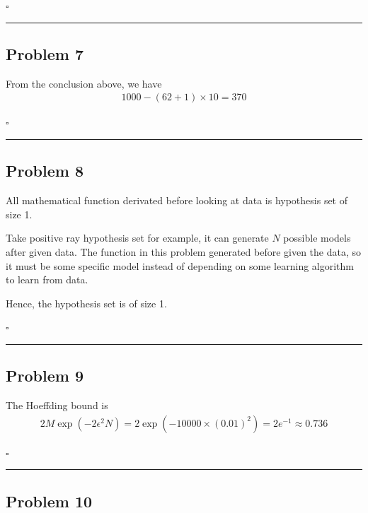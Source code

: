 \documentclass[12pt]{article}
\newcommand*{\QEDB}{\hfill\ensuremath{\square}}
\newcommand{\ParTh}[1]{\left(#1\right)}
\newcommand{\horrule}[1]{\rule{\linewidth}{#1}}
\begin{document}
\QEDB

\horrule{0.5pt}

\subsection*{Problem 7}

From the conclusion above, we have
\begin{align}
1000-\ParTh{62+1}\times10=370
\end{align}

\QEDB

\horrule{0.5pt}

\subsection*{Problem 8}

All mathematical function derivated before looking at data is hypothesis set of size 1.

Take positive ray hypothesis set for example, it can generate $N$ possible models after given data. The function in this problem generated before given the data, so it must be some specific model instead of depending on some learning algorithm to learn from data.

Hence, the hypothesis set is of size 1.

\QEDB

\horrule{0.5pt}

\subsection*{Problem 9}

The Hoeffding bound is
\begin{align}
2M\exp\ParTh{-2\epsilon^2N}=2\exp\ParTh{-10000\times\ParTh{0.01}^2}=2e^{-1}\approx0.736
\end{align}

\QEDB

\horrule{0.5pt}

\subsection*{Problem 10}
\end{document}

